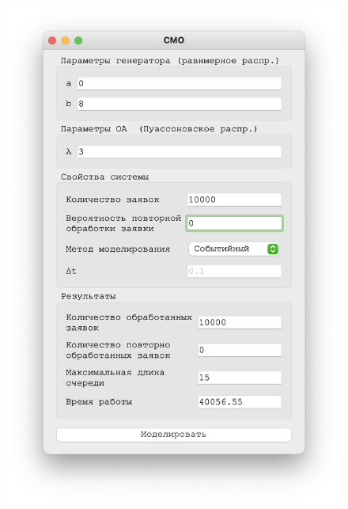  \begin{figure}[!htb]
    \begin{minipage}{0.55\textwidth}
      \centering
      \includegraphics[width=1\linewidth]{3-0-s}
    \end{minipage}\hfill
    \begin{minipage}{0.55\textwidth}
      \centering

\end{minipage}
\end{figure}
